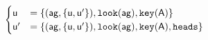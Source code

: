 $\begin{cases}
 \poss u &= \bra{(\agent{ag},\bra{\poss{u}, \poss{u^\prime}}), \looking{ag}, \haskey{a}}\\
 \poss u^\prime &= \bra{(\agent{ag},\bra{\poss{u}, \poss{u^\prime}}), \looking{ag}, \haskey{a}, \head}
\end{cases}$
